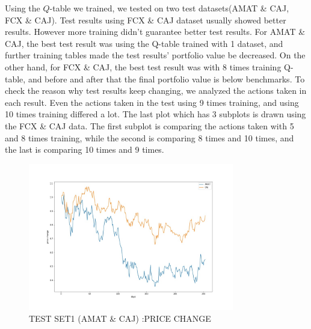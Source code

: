Using the $Q$-table we trained, we tested on two test datasets(AMAT \& CAJ, FCX \& CAJ). Test results using FCX \& CAJ dataset usually showed better results. However more training didn’t guarantee better test results. For AMAT \& CAJ, the best test result was using the Q-table trained with 1 dataset, and further training tables made the test results’ portfolio value be decreased. On the other hand, for FCX \& CAJ, the best test result was with 8 times training Q-table, and before and after that the final portfolio value is below benchmarks. To check the reason why test results keep changing, we analyzed the actions taken in each result. Even the actions taken in the test using 9 times training, and using 10 times training differed a lot. The last plot which has 3 subplots is drawn using the FCX \& CAJ data. The first subplot is comparing the actions taken with 5 and 8 times training, while the second is comparing 8 times and 10 times, and the last is comparing 10 times and 9 times.
\vspace{0.05cm}
\begin{figure}[H]
\begin{center}
\includegraphics[clip, width=0.8\textwidth]{Graphics/test1_pricechange.jpg} \caption{TEST SET1 (AMAT \& CAJ) :PRICE CHANGE}
\end{center}
\end{figure}

\newpage

